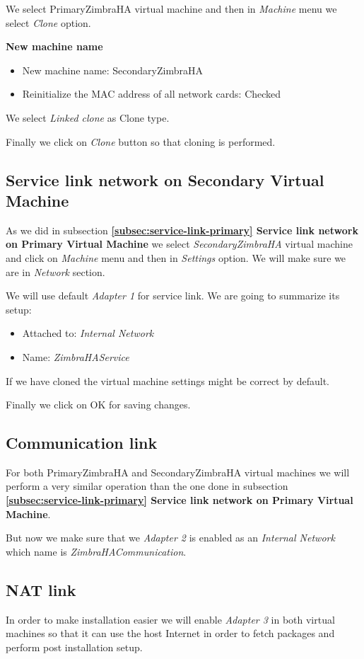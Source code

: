 We select PrimaryZimbraHA virtual machine and then in \textit{Machine} menu we select \textit{Clone} option.

\textbf{New machine name}
\begin{itemize}
  \item New machine name: SecondaryZimbraHA
  \item Reinitialize the MAC address of all network cards: Checked
\end{itemize}

We select \textit{Linked clone} as Clone type.

Finally we click on \textit{Clone} button so that cloning is performed.

\subsection {Service link network on Secondary Virtual Machine}
As we did in subsection \textbf{\ref{subsec:service-link-primary} Service link network on Primary Virtual Machine} we select \textit{SecondaryZimbraHA} virtual machine and click on \textit{Machine} menu and then in \textit{Settings} option. We will make sure we are in \textit{Network} section.

We will use default \textit{Adapter 1} for service link. We are going to summarize its setup:
\begin{itemize}
  \item Attached to: \textit{Internal Network}
  \item Name: \textit{ZimbraHAService}
\end{itemize}

If we have cloned the virtual machine settings might be correct by default.

Finally we click on OK for saving changes.

\subsection {Communication link}
For both PrimaryZimbraHA and SecondaryZimbraHA virtual machines we will perform a very similar operation than the one done in subsection \textbf{\ref{subsec:service-link-primary} Service link network on Primary Virtual Machine}.

But now we make sure that we \textit{Adapter 2} is enabled as an \textit{Internal Network} which name is \textit{ZimbraHACommunication}.

\subsection {NAT link}
In order to make installation easier we will enable \textit{Adapter 3} in both virtual machines so that it can use the host Internet in order to fetch packages and perform post installation setup.

